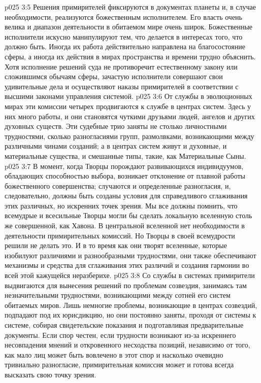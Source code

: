 \vs p025 3:5 Решения примирителей фиксируются в документах планеты и, в случае необходимости, реализуются божественным исполнителем. Его власть очень велика и диапазон деятельности в обитаемом мире очень широк. Божественные исполнители искусно манипулируют тем, что делается в интересах того, что должно быть. Иногда их работа действительно направлена на благосостояние сферы, а иногда их действия в мирах пространства и времени трудно объяснить. Хотя исполнение решений суда не противоречит естественному закону или сложившимся обычаям сферы, зачастую исполнители совершают свои удивительные дела и осуществляют наказы примирителей в соответствии с высшими законами управления системой.
\vs p025 3:6 \bibnobreakspace {} От службы в эволюционных мирах эти комиссии четырех продвигаются к службе в центрах систем. Здесь у них много работы, и они становятся чуткими друзьями людей, ангелов и других духовных существ. Эти судебные трио заняты не столько личностными трудностями, сколько разногласиями групп, размолвками, возникающими между различными чинами созданий; а в центрах систем живут и духовные, и материальные существа, и смешанные типы, такие, как Материальные Сыны.
\vs p025 3:7 В момент, когда Творцы порождают развивающихся индивидуумов, обладающих способностью выбора, возникает отклонение от плавной работы божественного совершенства; случаются и определенные разногласия, и, следовательно, должны быть созданы условия для справедливого сглаживания этих различных, но искренних точек зрения. Мы все должны помнить, что всемудрые и всесильные Творцы могли бы сделать локальную вселенную столь же совершенной, как Хавона. В центральной вселенной нет необходимости в деятельности примирительных комиссий. Но Творцы в своей всемудрости решили не делать это. И в то время как они творят вселенные, которые изобилуют различиями и разнообразными трудностями, они также обеспечивают механизмы и средства для сглаживания этих различий и создания гармонии во всей этой кажущейся неразберихе.
\vs p025 3:8 \bibnobreakspace {} Со службы в системах примирители выдвигаются для вынесения решений по проблемам созвездия, занимаясь там незначительными трудностями, возникающими между сотней его систем обитаемых миров. Лишь немногие проблемы, возникающие в центрах созвездий, подпадают под их юрисдикцию, но они постоянно заняты, проходя от системы к системе, собирая свидетельские показания и подготавливая предварительные документы. Если спор честен, если трудности возникают из\hyp{}за искреннего несовпадения мнений и откровенного несходства позиций, независимо от того, как мало лиц может быть вовлечено в этот спор и насколько очевидно тривиально разногласие, примирительная комиссия может и готова всегда высказать свою точку зрения.
